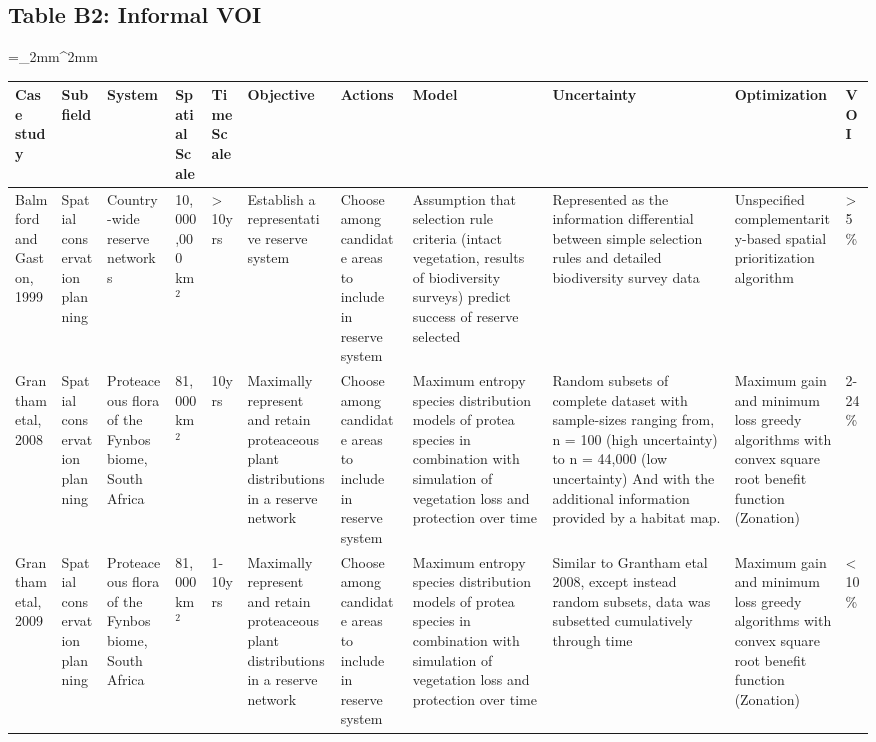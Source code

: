 \documentclass[]{article}
\theoremstyle{definition}
\theoremstyle{definition}
\theoremstyle{definition}
\theoremstyle{remark}
\begin{document}
\begin{landscape}
\subsection*{Table B2: Informal VOI}
\bgroup
\linespread{1}\scriptsize
\extrarowsep=_2mm^2mm
\begin{longtabu} to 230mm {|X[1,l] X[1,l] X[1,l] X[1,l] X[.8,l] X[1,l] X[1,l] X[1,l] X[1,l] X[1,l] X[.5,l]|} \hline 
Case study & Subfield & System & Spatial Scale & Time Scale & Objective & Actions & Model & Uncertainty & Optimization & VOI \\ \hline
Balmford and Gaston, 1999 & Spatial conservation planning & Country-wide reserve networks & 10,000,000 km$^2$ & > 10yrs & Establish a representative reserve system & Choose among candidate areas to include in reserve system & Assumption that selection rule criteria (intact vegetation, results of biodiversity surveys) predict success of reserve selected  & Represented as the information differential between simple selection rules and detailed biodiversity survey data & Unspecified complementarity-based spatial prioritization algorithm & >5\% \\ 
Grantham etal, 2008 & Spatial conservation planning & Proteaceous flora of the Fynbos biome, South Africa  & 81,000 km$^2$ & 10yrs & Maximally represent and retain proteaceous plant distributions in a reserve network & Choose among candidate areas to include in reserve system & Maximum entropy species distribution models of protea species in combination with simulation of vegetation loss and protection over time & Random subsets of complete dataset with sample-sizes ranging from, n = 100 (high uncertainty) to n = 44,000 (low uncertainty) And with the additional information provided by a habitat map. & Maximum gain and minimum loss greedy algorithms with convex square root benefit function (Zonation) & 2-24\% \\ 
Grantham etal, 2009 & Spatial conservation planning & Proteaceous flora of the Fynbos biome, South Africa  & 81,000 km$^2$ & 1-10yrs & Maximally represent and retain proteaceous plant distributions in a reserve network & Choose among candidate areas to include in reserve system & Maximum entropy species distribution models of protea species in combination with simulation of vegetation loss and protection over time & Similar to Grantham etal 2008, except instead random subsets, data was subsetted cumulatively through time & Maximum gain and minimum loss greedy algorithms with convex square root benefit function (Zonation) & <10\% \\ 

\end{longtabu}
\end{landscape}
\end{document}
